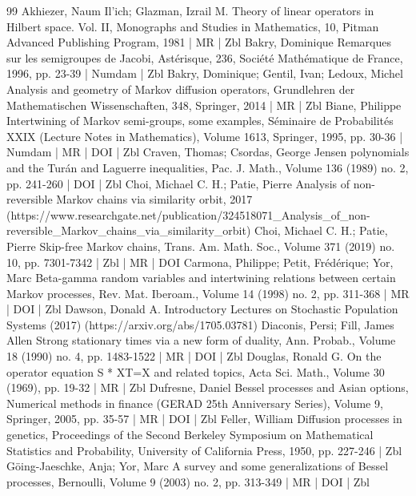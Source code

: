 \documentclass[10pt]{amsart}
\theoremstyle{definition}\newtheorem{defi}[theo]{Definition}\newtheorem{rema}[theo]{Remark}\newtheorem{exam}[theo]{Example}\newtheorem{exem}[theo]{Example}\newtheorem{nota}[theo]{Notation}
\begin{document}
\begin{thebibliography}{99}
Akhiezer, Naum Il’ich; Glazman, Izrail M. Theory of linear operators in Hilbert space. Vol. II, Monographs and Studies in Mathematics, 10, Pitman Advanced Publishing Program, 1981 | MR | Zbl
Bakry, Dominique Remarques sur les semigroupes de Jacobi, Astérisque, 236, Société Mathématique de France, 1996, pp. 23-39 | Numdam | Zbl
Bakry, Dominique; Gentil, Ivan; Ledoux, Michel Analysis and geometry of Markov diffusion operators, Grundlehren der Mathematischen Wissenschaften, 348, Springer, 2014 | MR | Zbl
Biane, Philippe Intertwining of Markov semi-groups, some examples, Séminaire de Probabilités XXIX (Lecture Notes in Mathematics), Volume 1613, Springer, 1995, pp. 30-36 | Numdam | MR | DOI | Zbl
Craven, Thomas; Csordas, George Jensen polynomials and the Turán and Laguerre inequalities, Pac. J. Math., Volume 136 (1989) no. 2, pp. 241-260 | DOI | Zbl
Choi, Michael C. H.; Patie, Pierre Analysis of non-reversible Markov chains via similarity orbit, 2017 (https://www.researchgate.net/publication/324518071\_Analysis\_of\_non-reversible\_Markov\_chains\_via\_similarity\_orbit)
Choi, Michael C. H.; Patie, Pierre Skip-free Markov chains, Trans. Am. Math. Soc., Volume 371 (2019) no. 10, pp. 7301-7342 | Zbl | MR | DOI
Carmona, Philippe; Petit, Frédérique; Yor, Marc Beta-gamma random variables and intertwining relations between certain Markov processes, Rev. Mat. Iberoam., Volume 14 (1998) no. 2, pp. 311-368 | MR | DOI | Zbl
Dawson, Donald A. Introductory Lectures on Stochastic Population Systems (2017) (https://arxiv.org/abs/1705.03781)
Diaconis, Persi; Fill, James Allen Strong stationary times via a new form of duality, Ann. Probab., Volume 18 (1990) no. 4, pp. 1483-1522 | MR | DOI | Zbl
Douglas, Ronald G. On the operator equation S * XT=X and related topics, Acta Sci. Math., Volume 30 (1969), pp. 19-32 | MR | Zbl
Dufresne, Daniel Bessel processes and Asian options, Numerical methods in finance (GERAD 25th Anniversary Series), Volume 9, Springer, 2005, pp. 35-57 | MR | DOI | Zbl
Feller, William Diffusion processes in genetics, Proceedings of the Second Berkeley Symposium on Mathematical Statistics and Probability, University of California Press, 1950, pp. 227-246 | Zbl
Göing-Jaeschke, Anja; Yor, Marc A survey and some generalizations of Bessel processes, Bernoulli, Volume 9 (2003) no. 2, pp. 313-349 | MR | DOI | Zbl

\end{thebibliography}
\end{document}
